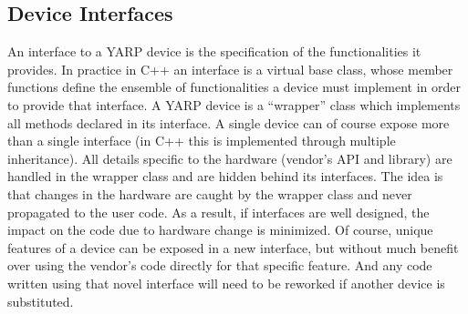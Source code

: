 \subsection{Device Interfaces}
An interface to a YARP device is the specification of the functionalities
it provides. In practice in C++ an interface is a virtual base class, whose 
member functions define the ensemble of  functionalities a device must 
implement in order to provide that interface.  A YARP device is a 
``wrapper'' class which implements all methods declared in its interface. 
A single device can of course expose more than a single interface 
(in C++ this is implemented through multiple
inheritance). All details specific to the hardware 
(vendor's API and library) are handled in the wrapper class and are 
hidden behind its interfaces. 
The idea is that changes in the hardware are caught by the wrapper class 
and never propagated to the user code. As a result, if interfaces are 
well designed, the impact on the code due to hardware change is minimized. 
%
Of course, unique features of a device can be exposed in a new interface,
but without much benefit over using the vendor's code directly for that
specific feature.  And any code written using that novel interface will
need to be reworked if another device is substituted.

